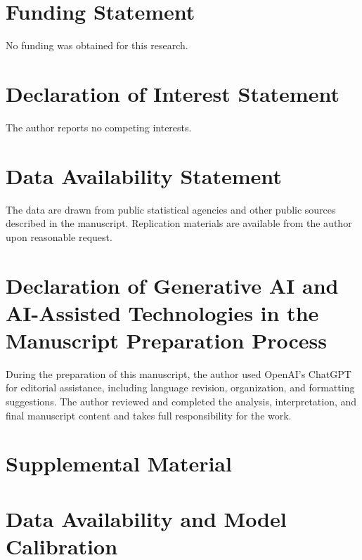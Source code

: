 \documentclass[12pt]{article}
\begin{document}
\section*{Funding Statement}

No funding was obtained for this research.

\section*{Declaration of Interest Statement}

The author reports no competing interests.

\section*{Data Availability Statement}

The data are drawn from public statistical agencies and other public sources described in the manuscript. Replication materials are available from the author upon reasonable request.

\section*{Declaration of Generative AI and AI-Assisted Technologies in the Manuscript Preparation Process}

During the preparation of this manuscript, the author used OpenAI's ChatGPT for editorial assistance, including language revision, organization, and formatting suggestions. The author reviewed and completed the analysis, interpretation, and final manuscript content and takes full responsibility for the work.

\clearpage

\setcounter{section}{0}
\setcounter{table}{0}
\setcounter{figure}{0}

\renewcommand{\thesection}{S\arabic{section}}
\renewcommand{\thetable}{S\arabic{table}}
\renewcommand{\thefigure}{S\arabic{figure}}


\clearpage 

\section*{Supplemental Material}

\section{Data Availability and Model Calibration}\label{app:data_calibration}
\end{document}
